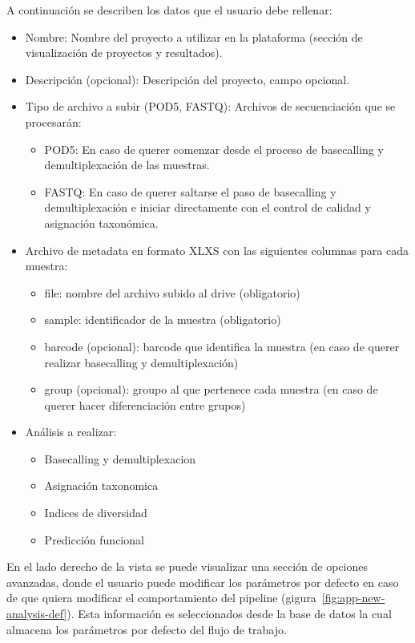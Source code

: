 A continuación se describen los datos que el usuario debe rellenar:

\begin{itemize}
    \item Nombre: Nombre del proyecto a utilizar en la plataforma (sección de visualización de proyectos y resultados).
    \item Descripción (opcional): Descripción del proyecto, campo opcional.
    \item Tipo de archivo a subir (POD5, FASTQ): Archivos de secuenciación que se procesarán:
    \begin{itemize}
        \item POD5: En caso de querer comenzar desde el proceso de basecalling y demultiplexación de las muestras.
        \item FASTQ: En caso de querer saltarse el paso de basecalling y demultiplexación e iniciar directamente con el control de calidad y asignación taxonómica.
    \end{itemize}
    \item Archivo de metadata en formato XLXS con las siguientes columnas para cada muestra:
    \begin{itemize}
        \item file: nombre del archivo subido al drive (obligatorio)
        \item sample: identificador de la muestra (obligatorio)
        \item barcode (opcional): barcode que identifica la muestra (en caso de querer realizar basecalling y demultiplexación)
        \item group (opcional): groupo al que pertenece cada muestra (en caso de querer hacer diferenciación entre grupos)
    \end{itemize}
    \item Análisis a realizar:
    \begin{itemize}
        \item Basecalling y demultiplexacion
        \item Asignación taxonomica
        \item Indices de diversidad
        \item Predicción funcional
    \end{itemize}
\end{itemize}


En el lado derecho de la vista se puede visualizar una sección de opciones avanzadas, donde el usuario puede modificar los parámetros por defecto en caso de que quiera modificar el comportamiento del pipeline (gigura~\ref{fig:app-new-analysis-def}). Esta información es seleccionados desde la base de datos la cual almacena los parámetros por defecto del flujo de trabajo.

